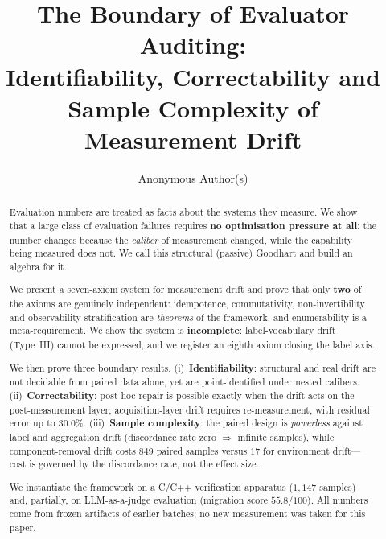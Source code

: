 \documentclass[11pt]{article}
\title{The Boundary of Evaluator Auditing:\\
Identifiability, Correctability and Sample Complexity of Measurement Drift}
\author{Anonymous Author(s)}
\date{}
\begin{document}
\maketitle

\begin{abstract}
Evaluation numbers are treated as facts about the systems they measure. We show that a large class of
evaluation failures requires \textbf{no optimisation pressure at all}: the number changes because the
\emph{caliber} of measurement changed, while the capability being measured does not. We call this
structural (passive) Goodhart and build an algebra for it.

We present a seven-axiom system for measurement drift and prove that only \textbf{two} of the axioms are
genuinely independent: idempotence, commutativity, non-invertibility and observability-stratification are
\emph{theorems} of the framework, and enumerability is a meta-requirement. We show the system is
\textbf{incomplete}: label-vocabulary drift (Type~III) cannot be expressed, and we register an eighth axiom
closing the label axis.

We then prove three boundary results. (i)~\textbf{Identifiability}: structural and real drift are not
decidable from paired data alone, yet are point-identified under nested calibers. (ii)~\textbf{Correctability}:
post-hoc repair is possible exactly when the drift acts on the post-measurement layer; acquisition-layer
drift requires re-measurement, with residual error up to $30.0\%$. (iii)~\textbf{Sample complexity}: the
paired design is \emph{powerless} against label and aggregation drift (discordance rate zero
$\Rightarrow$ infinite samples), while component-removal drift costs $849$ paired samples versus $17$ for
environment drift---cost is governed by the discordance rate, not the effect size.

We instantiate the framework on a C/C++ verification apparatus ($1{,}147$ samples) and, partially, on
LLM-as-a-judge evaluation (migration score $55.8/100$). All numbers come from frozen artifacts of earlier
batches; no new measurement was taken for this paper.
\end{abstract}
\end{document}
